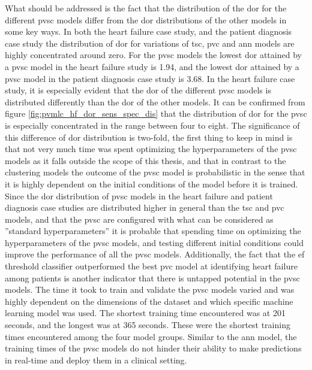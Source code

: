 What should be addressed is the fact that the distribution of the \acrshort{dor} for the different \acrshort{pvsc} models differ from the \acrshort{dor} distributions of the other models in some key ways. In both the heart failure case study, and the patient diagnosis case study the distribution of \acrshort{dor} for variations of \acrshort{tsc}, \acrshort{pvc} and \acrshort{ann} models are highly concentrated around zero. For the \acrshort{pvsc} models the lowest \acrshort{dor} attained by a \acrshort{pvsc} model in the heart failure study is 1.94, and the lowest \acrshort{dor} attained by a \acrshort{pvsc} model in the patient diagnosis case study is 3.68. In the heart failure case study, it is especially evident that the \acrshort{dor} of the different \acrshort{pvsc} models is distributed differently than the \acrshort{dor} of the other models. It can be confirmed from figure \ref{fig:pvmlc_hf_dor_sens_spec_dis} that the distribution of \acrshort{dor} for the \acrshort{pvsc} is especially concentrated in the range between four to eight. The significance of this difference of \acrshort{dor} distribution is two-fold, the first thing to keep in mind is that not very much time was spent optimizing the hyperparameters of the \acrshort{pvsc} models as it falls outside the scope of this thesis, and that in contrast to the clustering models the outcome of the \acrshort{pvsc} model is probabilistic in the sense that it is highly dependent on the initial conditions of the model before it is trained. Since the \acrshort{dor} distribution of \acrshort{pvsc} models in the heart failure and patient diagnosis case studies are distributed higher in general than the \acrshort{tsc} and \acrshort{pvc} models, and that the \acrshort{pvsc} are configured with what can be considered as ''standard hyperparameters'' it is probable that spending time on optimizing the hyperparameters of the \acrshort{pvsc} models, and testing different initial conditions could improve the performance of all the \acrshort{pvsc} models. Additionally, the fact that the \acrshort{ef} threshold classifier outperformed the best \acrshort{pvc} model at identifying heart failure among patients is another indicator that there is untapped potential in the \acrshort{pvsc} models. \bigskip
The time it took to train and validate the \acrshort{pvsc} models varied and was highly dependent on the dimensions of the dataset and which specific machine learning model was used. The shortest training time encountered was at 201 seconds, and the longest was at 365 seconds. These were the shortest training times encountered among the four model groups. Similar to the \acrshort{ann} model, the training times of the \acrshort{pvsc} models do not hinder their ability to make predictions in real-time and deploy them in a clinical setting.

